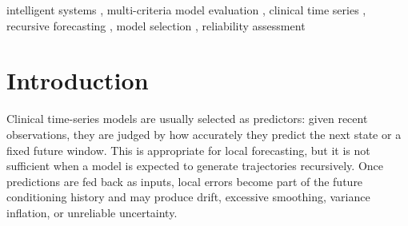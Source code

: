 \documentclass[preprint,12pt]{elsarticle}
\begin{document}
\begin{frontmatter}
\begin{abstract}
\textbf{Results:}
No criterion-independent model winner emerged. Transformer achieved the best validation NLL ($0.8394 \pm 0.0020$), the lowest internal one-step normalized MacroMAE (0.4076), and the most reliable conditional predictive intervals. At 48 h, Transformer and RSSM were statistically unresolved for recursive state fidelity (paired difference 0.0036, 95\% CI $[-0.0424, 0.0622]$). RSSM nevertheless achieved significantly lower DynamicMAE than Transformer (difference 0.00372, 95\% CI $[0.00093, 0.00650]$), while exhibiting stronger temporal variance contraction and poorer interval coverage. Relative model preference also changed across observation-density strata. On held-out Set B, the same multi-axis pattern persisted: predictive fit and interval reliability favored Transformer, temporal-change error favored RSSM, recursive state fidelity remained unresolved between them, and density-dependent selection persisted.

\textbf{Conclusion:}
Predictive fit, recursive state fidelity, temporal-change error, temporal variability, uncertainty reliability, and observation regime provide complementary rather than interchangeable evidence. Clinical trajectory models should therefore be evaluated and selected according to the properties required by their intended use rather than by a single predictive criterion.

\end{abstract}

\begin{keyword}
intelligent systems \sep
multi-criteria model evaluation \sep
clinical time series \sep
recursive forecasting \sep
model selection \sep
reliability assessment
\end{keyword}

\end{frontmatter}
\linenumbers

\section{Introduction}

Clinical time-series models are usually selected as predictors: given recent observations, they are judged by how accurately they predict the next state or a fixed future window. This is appropriate for local forecasting, but it is not sufficient when a model is expected to generate trajectories recursively. Once predictions are fed back as inputs, local errors become part of the future conditioning history and may produce drift, excessive smoothing, variance inflation, or unreliable uncertainty.
\end{document}
